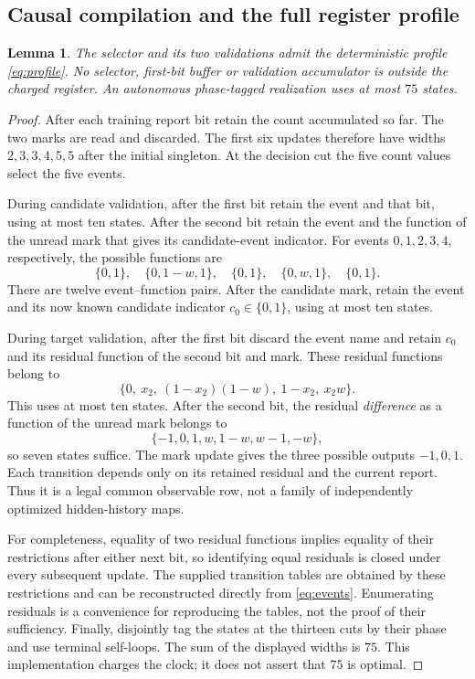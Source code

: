 \documentclass[11pt]{amsart}
\newtheorem{lemma}[theorem]{Lemma}
\theoremstyle{definition}\newtheorem{definition}[theorem]{Definition}
\theoremstyle{remark}\newtheorem{remark}[theorem]{Remark}
\newcommand{\1}{\mathbf 1}
\begin{document}
\subsection{Causal compilation and the full register profile}
\begin{lemma}\label{lem:profile}
The selector and its two validations admit the deterministic profile
\eqref{eq:profile}. No selector, first-bit buffer or validation accumulator
is outside the charged register. An autonomous phase-tagged realization
uses at most $75$ states.
\end{lemma}
\begin{proof}
After each training report bit retain the count accumulated so far.
The two marks are read and discarded. The first six updates therefore
have widths $2,3,3,4,5,5$ after the initial singleton. At the decision
cut the five count values select the five events.

During candidate validation, after the first bit retain the event and
that bit, using at most ten states. After the second bit retain the event
and the function of the unread mark that gives its candidate-event
indicator. For events $0,1,2,3,4$, respectively, the possible functions are
\[
 \{0,1\},\quad\{0,1-w,1\},\quad\{0,1\},\quad
 \{0,w,1\},\quad\{0,1\}.
\]
There are twelve event--function pairs. After the candidate mark, retain
the event and its now known candidate indicator $c_0\in\{0,1\}$,
using at most ten states.

During target validation, after the first bit discard the event name
and retain $c_0$ and its residual function of the second bit and mark.
These residual functions belong to
\[
 \{0,\ x_2,\ (1-x_2)(1-w),\ 1-x_2,\ x_2w\}.
\]
This uses at most ten states. After the second bit, the residual
\emph{difference} as a function of the unread mark belongs to
\[
 \{-1,0,1,w,1-w,w-1,-w\},
\]
so seven states suffice. The mark update gives the three possible outputs
$-1,0,1$. Each transition depends only on its retained residual and the
current report. Thus it is a legal common observable row, not a family
of independently optimized hidden-history maps.

For completeness, equality of two residual functions implies equality of
their restrictions after either next bit, so identifying equal residuals
is closed under every subsequent update. The supplied transition tables
are obtained by these restrictions and can be reconstructed directly from
\eqref{eq:events}. Enumerating residuals is a convenience for reproducing
the tables, not the proof of their sufficiency. Finally, disjointly tag
the states at the thirteen cuts by their phase and use terminal
self-loops. The sum of the displayed widths is $75$. This implementation
charges the clock; it does not assert that $75$ is optimal.
\end{proof}
\end{document}
